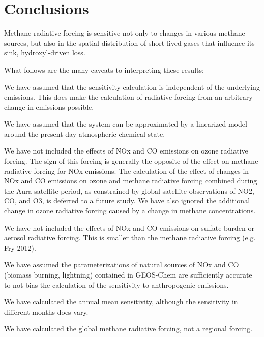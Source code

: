 \section{Conclusions}

Methane radiative forcing is sensitive not only to changes in various methane sources, but also in the spatial distribution of short-lived gases that influence its sink, hydroxyl-driven loss.

What follows are the many caveats to interpreting these results:

We have assumed that the sensitivity calculation is independent of the underlying emissions. This does make the calculation of radiative forcing from an arbitrary change in emissions possible.

We have assumed that the system can be approximated by a linearized model around the present-day atmospheric chemical state.

We have not included the effects of NOx and CO emissions on ozone radiative forcing. The sign of this forcing is generally the opposite of the effect on methane radiative forcing for NOx emissions. The calculation of the effect of changes in NOx and CO emissions on ozone and methane radiative forcing combined during the Aura satellite period, as constrained by global satellite observations of NO2, CO, and O3, is deferred to a future study. We have also ignored the additional change in ozone radiative forcing caused by a change in methane concentrations.

We have not included the effects of NOx and CO emissions on sulfate burden or aerosol radiative forcing. This is smaller than the methane radiative forcing (e.g. Fry 2012).

We have assumed the parameterizations of natural sources of NOx and CO (biomass burning, lightning) contained in GEOS-Chem are sufficiently accurate to not bias the calculation of the sensitivity to anthropogenic emissions.

We have calculated the annual mean sensitivity, although the sensitivity in different months does vary.

We have calculated the global methane radiative forcing, not a regional forcing.
